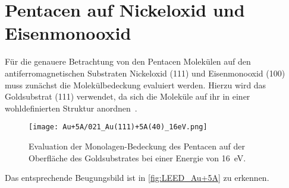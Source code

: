     \section{Pentacen auf Nickeloxid und Eisenmonooxid} \label{sec:Ergeb}
        Für die genauere Betrachtung von den Pentacen Molekülen auf den antiferromagnetischen Substraten Nickeloxid (111) und Eisenmonooxid (100) muss zunächst die Molekülbedeckung evaluiert werden.
        Hierzu wird das Goldsubstrat (111) verwendet, da sich die Moleküle auf ihr in einer wohldefinierten Struktur anordnen~\cite{5A_4}.
        \begin{figure}
            \centering
            \texttt{[image: Au+5A/021\_Au(111)+5A(40)\_16eV.png]}
            \caption{Evaluation der Monolagen-Bedeckung des Pentacen auf der Oberfläche des Goldsubstrates bei einer Energie von \SI{16}{\electronvolt}.}
            \label{fig:LEED_Au+5A}
        \end{figure}
        Das entsprechende Beugungsbild ist in \autoref{fig:LEED_Au+5A} zu erkennen.
    

